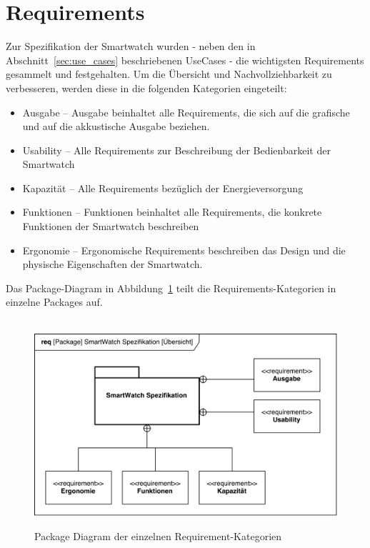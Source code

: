 \section{Requirements}
Zur Spezifikation der Smartwatch wurden - neben den in Abschnitt~\ref{sec:use_cases} beschriebenen UseCases - die wichtigsten Requirements gesammelt und festgehalten. Um die Übersicht und Nachvollziehbarkeit zu verbesseren, werden diese in die folgenden Kategorien eingeteilt:

\begin{itemize}
	\item Ausgabe -- Ausgabe beinhaltet alle Requirements, die sich auf die grafische und auf die akkustische Ausgabe beziehen.
	\item Usability -- Alle Requirements zur Beschreibung der Bedienbarkeit der Smartwatch
	\item Kapazität -- Alle Requirements bezüglich der Energieversorgung
	\item Funktionen -- Funktionen beinhaltet alle Requirements, die konkrete Funktionen der Smartwatch beschreiben
	\item Ergonomie -- Ergonomische Requirements beschreiben das Design und die physische Eigenschaften der Smartwatch.
\end{itemize}

Das Package-Diagram in Abbildung~\ref{fig:package_diagram_requirements} teilt die Requirements-Kategorien in einzelne Packages auf.

\begin{figure}[H]
\centering\
\includegraphics[width=14cm]{img/package_diagram_smartWatch_requirements}
\caption[Requirements: Package Diagram]{Package Diagram der einzelnen Requirement-Kategorien}\label{fig:package_diagram_requirements}
\end{figure}


